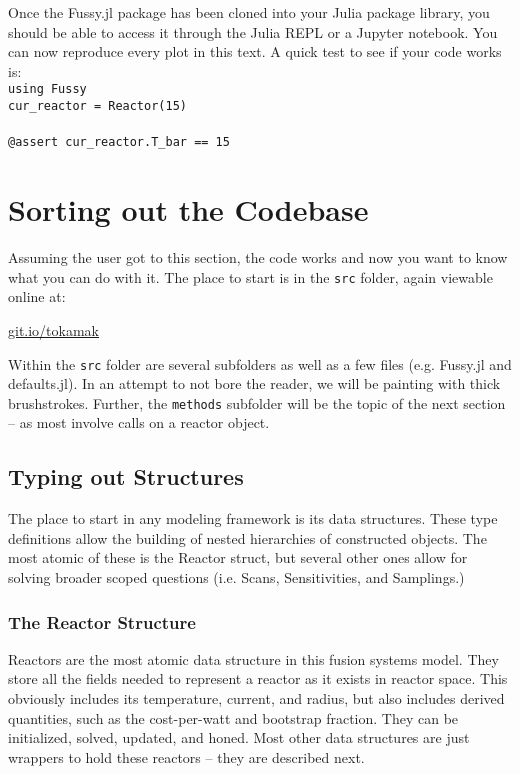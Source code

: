 Once the Fussy.jl package has been cloned into your Julia package library, you should be able to access it through the Julia REPL or a Jupyter notebook. You can now reproduce every plot in this text. A quick test to see if your code works is: \\

\texttt{using Fussy \\
cur\_reactor = Reactor(15) \\ \\
@assert cur\_reactor.T\_bar == 15
}

\section{Sorting out the Codebase}

Assuming the user got to this section, the code works and now you want to know what you can do with it. The place to start is in the \texttt{src} folder, again viewable online at:

{\centering \href{http://git.io/tokamak}{git.io/tokamak} \par }

Within the \texttt{src} folder are several subfolders as well as a few files (e.g. Fussy.jl and defaults.jl). In an attempt to not bore the reader, we will be painting with thick brushstrokes. Further, the \texttt{methods} subfolder will be the topic of the next section -- as most involve calls on a reactor object.

\subsection{Typing out Structures}

The place to start in any modeling framework is its data structures. These type definitions allow the building of nested hierarchies of constructed objects. The most atomic of these is the Reactor struct, but several other ones allow for solving broader scoped questions (i.e. Scans, Sensitivities, and Samplings.)

\subsubsection{The Reactor Structure}

Reactors are the most atomic data structure in this fusion systems model. They store all the fields needed to represent a reactor as it exists in reactor space. This obviously includes its temperature, current, and radius, but also includes derived quantities, such as the cost-per-watt and bootstrap fraction. They can be initialized, solved, updated, and honed. Most other data structures are just wrappers to hold these reactors -- they are described next.

